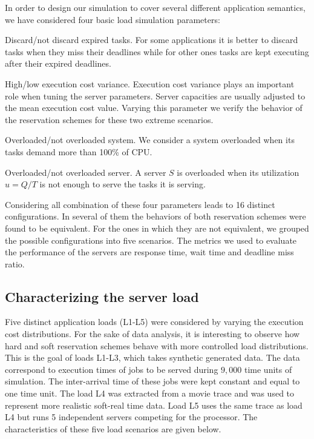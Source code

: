 \documentclass[12pt]{article}
\begin{document}
In order to design our simulation to cover several different
application semantics, we have considered four basic load simulation
parameters:
\begin{description}
\item Discard/not discard expired tasks. For some applications it is
  better to discard tasks when they miss their deadlines while for
  other ones tasks are kept executing after their expired deadlines.
\item High/low execution cost variance. Execution cost variance plays
  an important role when tuning the server parameters. Server
  capacities are usually adjusted to the mean execution cost
  value. Varying this parameter we verify the behavior of the
  reservation schemes for these two extreme scenarios.
\item Overloaded/not overloaded system. We consider a system
  overloaded when its tasks demand more than 100\% of CPU.
\item Overloaded/not overloaded server. A server $S$ is overloaded
  when its utilization $u = Q/T$ is not enough to serve the tasks it
  is serving.
\end{description}

Considering all combination of these four parameters leads to 16
distinct configurations. In several of them the behaviors of both
reservation schemes were found to be equivalent.  For the ones in
which they are not equivalent, we grouped the possible configurations
into five scenarios. The metrics we used to evaluate the performance
of the servers are response time, wait time and deadline miss ratio.

\subsection{Characterizing the server load}
\label{sec:charact-server-load}

Five distinct application loads (L1-L5) were considered by varying the
execution cost distributions.  For the sake of data analysis, it is
interesting to observe how hard and soft reservation schemes behave
with more controlled load distributions. This is the goal of loads
L1-L3, which takes synthetic generated data. The data correspond to
execution times of jobs to be served during $9,000$ time units of
simulation.  The inter-arrival time of these jobs were kept constant
and equal to one time unit.  The load L4 was extracted from a movie
trace and was used to represent more realistic soft-real time
data. Load L5 uses the same trace as load L4 but runs 5 independent
servers competing for the processor. The characteristics of these five
load scenarios are given below.
\end{document}
